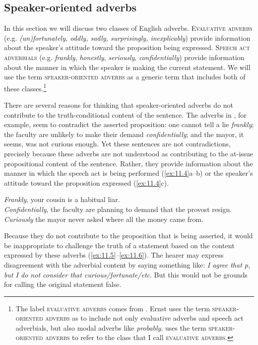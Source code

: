 \subsection{Speaker-oriented adverbs}\label{sec:11.2.2}
\largerpage
In this section we will discuss two classes of English adverbs. \textsc{Evaluative adverbs (}e.g. \textit{(un)fortunately, oddly, sadly, surprisingly, inexplicably}) provide information about the speaker’s attitude toward the proposition being expressed. \textsc{Speech act adverbials (}e.g. \textit{frankly}, \textit{honestly}, \textit{seriously}, \textit{confidentially}) provide information about the manner in which the speaker is making the current statement. We will use the term \textsc{speaker-oriented adverbs} as a generic term that includes both of these classes.\footnote{The label \textsc{evaluative adverbs} comes from \citet{Ernst2009}. Ernst uses the term \textsc{speaker-oriented adverbs} as to include not only evaluative adverbs and speech act adverbials, but also modal adverbs like \textit{probably}. \citet{Potts2005} uses the term \textsc{speaker-oriented adverbs} to refer to the class that I call \textsc{evaluative adverbs}.}



There are several reasons for thinking that speaker-oriented adverbs do not contribute to the truth-conditional content of the sentence. The adverbs in , for example, seem to contradict the asserted proposition: one cannot tell a lie \textit{frankly}; the faculty are unlikely to make their demand \textit{confidentially}; and the mayor, it seems, was not curious enough. Yet these sentences are not contradictions, precisely because these adverbs are not understood as contributing to the at-issue propositional content of the sentence. Rather, they provide information about the manner in which the speech act is being performed (\ref{ex:11.4}a--b) or the speaker’s attitude toward the proposition expressed (\ref{ex:11.4}c).


\ea \label{ex:11.4}
\ea \textit{Frankly}, your cousin is a habitual liar.\\
\ex \textit{Confidentially}, the faculty are planning to demand that the provost resign.\\
\ex \textit{Curiously} the mayor never asked where all the money came from.
                       \z
\z


Because they do not contribute to the proposition that is being asserted, it would be inappropriate to challenge the truth of a statement based on the content expressed by these adverbs (\ref{ex:11.5}--\ref{ex:11.6}). The hearer may express disagreement with the adverbial content by saying something like: \textit{I agree that p, but I do not consider that curious/fortunate/etc}. But this would not be grounds for calling the original statement false.


